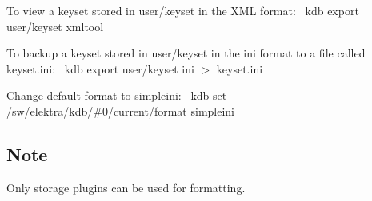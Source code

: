 To view a keyset stored in {\ttfamily user/keyset} in the X\+ML format\+:~\newline
 {\ttfamily kdb export user/keyset xmltool}~\newline


To backup a keyset stored in {\ttfamily user/keyset} in the {\ttfamily ini} format to a file called {\ttfamily keyset.\+ini}\+:~\newline
 {\ttfamily kdb export user/keyset ini $>$ keyset.\+ini}~\newline


Change default format to {\ttfamily simpleini}\+:~\newline
 {\ttfamily kdb set /sw/elektra/kdb/\#0/current/format simpleini}

\subsection*{Note}


\begin{DoxyItemize}
\item Only storage plugins can be used for formatting. 
\end{DoxyItemize}